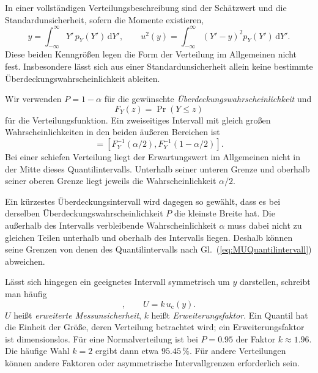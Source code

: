 In einer vollständigen Verteilungsbeschreibung sind der Schätzwert und die
Standardunsicherheit, sofern die Momente existieren,
\begin{equation}
y=\int_{-\infty}^{\infty}Y'\,p_Y(Y')\,\mathrm dY',\qquad
u^2(y)=\int_{-\infty}^{\infty}(Y'-y)^2p_Y(Y')\,\mathrm dY'.
\end{equation}
Diese beiden Kenngrößen legen die Form der Verteilung im Allgemeinen nicht
fest. Insbesondere lässt sich aus einer Standardunsicherheit allein keine
bestimmte Überdeckungswahrscheinlichkeit ableiten.

Wir verwenden $P=1-\alpha$ für die gewünschte
\textsl{Überdeckungswahrscheinlichkeit} und
\begin{equation}
F_Y(z)=\Pr(Y\leq z)
\end{equation}
für die Verteilungsfunktion. Ein zweiseitiges Intervall mit gleich großen
Wahrscheinlichkeiten in den beiden äußeren Bereichen ist
\begin{equation}
[y_{\mathrm{low}},y_{\mathrm{high}}]
=\left[F_Y^{-1}(\alpha/2),F_Y^{-1}(1-\alpha/2)\right].
\label{eq:MUQuantilintervall}
\end{equation}
Bei einer schiefen Verteilung liegt der Erwartungswert im Allgemeinen
nicht in der Mitte dieses Quantilintervalls. Unterhalb seiner unteren
Grenze und oberhalb seiner oberen Grenze liegt jeweils die
Wahrscheinlichkeit $\alpha/2$.

Ein kürzestes Überdeckungsintervall wird dagegen so gewählt, dass es
bei derselben Überdeckungswahrscheinlichkeit $P$ die kleinste Breite
hat. Die außerhalb des Intervalls verbleibende Wahrscheinlichkeit
$\alpha$ muss dabei nicht zu gleichen Teilen unterhalb und oberhalb
des Intervalls liegen. Deshalb können seine Grenzen von denen des
Quantilintervalls nach Gl.~(\ref{eq:MUQuantilintervall}) abweichen.

Lässt sich hingegen ein geeignetes Intervall symmetrisch um $y$ darstellen, schreibt man häufig
\begin{equation}
[y-U,y+U],\qquad U=k\,u_{\mathrm c}(y).
\end{equation}
$U$ heißt \textsl{erweiterte Messunsicherheit}, $k$ heißt
\textsl{Erweiterungsfaktor}. Ein Quantil hat die Einheit der Größe, deren
Verteilung betrachtet wird; ein Erweiterungsfaktor ist dimensionslos.
Für eine Normalverteilung ist bei $P=0.95$ der Faktor $k\approx1.96$.
Die häufige Wahl $k=2$ ergibt dann etwa $95.45\,\%$.
Für andere Verteilungen können andere Faktoren oder asymmetrische
Intervallgrenzen erforderlich sein.

